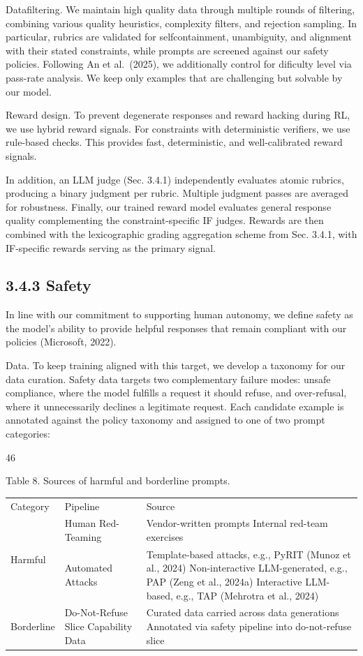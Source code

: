 \documentclass[
  10
]{article}
\newcounter{none} %
\begin{document}
Datafiltering. We maintain high quality data through multiple rounds of
filtering, combining various quality heuristics, complexity filters, and
rejection sampling. In particular, rubrics are validated for
selfcontainment, unambiguity, and alignment with their stated
constraints, while prompts are screened against our safety policies.
Following An et al.~(2025), we additionally control for dificulty level
via pass-rate analysis. We keep only examples that are challenging but
solvable by our model.

Reward design. To prevent degenerate responses and reward hacking during
RL, we use hybrid reward signals. For constraints with deterministic
verifiers, we use rule-based checks. This provides fast, deterministic,
and well-calibrated reward signals.

In addition, an LLM judge (Sec. 3.4.1) independently evaluates atomic
rubrics, producing a binary judgment per rubric. Multiple judgment
passes are averaged for robustness. Finally, our trained reward model
evaluates general response quality complementing the constraint-specific
IF judges. Rewards are then combined with the lexicographic grading
aggregation scheme from Sec. 3.4.1, with IF-specific rewards serving as
the primary signal.

\subsection{3.4.3 Safety}\label{safety}

In line with our commitment to supporting human autonomy, we define
safety as the model's ability to provide helpful responses that remain
compliant with our policies (Microsoft, 2022).

Data. To keep training aligned with this target, we develop a taxonomy
for our data curation. Safety data targets two complementary failure
modes: unsafe compliance, where the model fulfills a request it should
refuse, and over-refusal, where it unnecessarily declines a legitimate
request. Each candidate example is annotated against the policy taxonomy
and assigned to one of two prompt categories:

46

Table 8. Sources of harmful and borderline prompts.

{\def\LTcaptype{none} %
\begin{longtable}[]{@{}lll@{}}
\toprule\noalign{}
\endhead
\bottomrule\noalign{}
\endlastfoot
Category & Pipeline & Source \\
\multirow{2}{*}{Harmful} & Human Red-Teaming & Vendor-written prompts
Internal red-team exercises \\
& Automated Attacks & Template-based attacks, e.g., PyRIT (Munoz et al.,
2024) Non-interactive LLM-generated, e.g., PAP (Zeng et al., 2024a)
Interactive LLM-based, e.g., TAP (Mehrotra et al., 2024) \\
Borderline & Do-Not-Refuse Slice Capability Data & Curated data carried
across data generations Annotated via safety pipeline into do-not-refuse
slice \\
\end{longtable}
}
\end{document}
